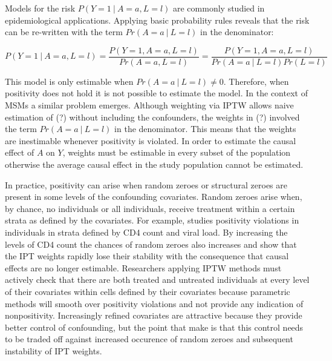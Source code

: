 \documentclass[11pt]{article}
\begin{document}
Models for the risk \(P(Y=1\ |\ A=a, L=l)\) are commonly studied in
epidemiological applications. Applying basic probability rules reveals
that the risk can be re-written with the term \(Pr(A=a\ |\ L=l)\) in the
denominator:

\[P(Y=1\ |\ A=a, L=l) = \frac{P(Y=1, A=a, L=l)}{Pr(A=a, L=l)} = \frac{P(Y=1, A=a, L=l)}{Pr(A=a\ |\ L=l)Pr(L=l)}\]

This model is only estimable when \(Pr(A=a\ |\ L=l) \neq 0\). Therefore,
when positivity does not hold it is not possible to estimate the model.
In the context of MSMs a similar problem emerges. Although weighting via
IPTW allows naive estimation of (?) without including the confounders,
the weights in (?) involved the term \(Pr(A=a\ |\ L=l)\) in the
denominator. This means that the weights are inestimable whenever
positivity is violated. In order to estimate the causal effect of \(A\)
on \(Y\), weights must be estimable in every subset of the population
otherwise the average causal effect in the study population cannot be
estimated.

In practice, positivity can arise when random zeroes or structural
zeroes are present in some levels of the confounding covariates. Random
zeroes arise when, by chance, no individuals or all individuals, receive
treatment within a certain strata as defined by the covariates. For
example, \citet{Cole2008} studies positivity violations in individuals
in strata defined by CD4 count and viral load. By increasing the levels
of CD4 count the chances of random zeroes also increases and
\citet{Cole2008} show that the IPT weights rapidly lose their stability
with the consequence that causal effects are no longer estimable.
Researchers applying IPTW methods must actively check that there are
both treated and untreated individuals at every level of their
covariates within cells defined by their covariates because parametric
methods will smooth over positivity violations and not provide any
indication of nonpositivity. Increasingly refined covariates are
attractive because they provide better control of confounding, but the
point that \citet{Cole2008} make is that this control needs to be traded
off against increased occurence of random zeroes and subsequent
instability of IPT weights.
\end{document}
